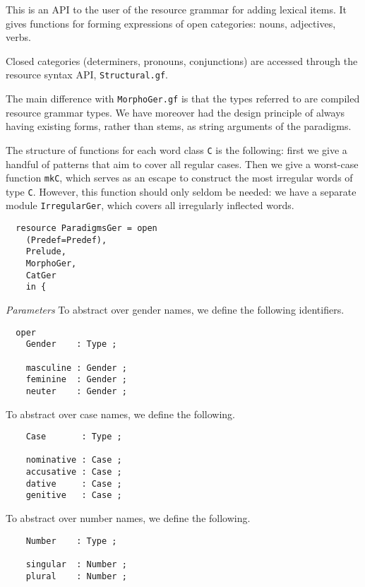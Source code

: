 \documentclass[11pt,a4paper]{article}
\newcommand{\subsubsubsection}[1]{\textit{#1}}
\begin{document}
This is an API to the user of the resource grammar 
for adding lexical items. It gives functions for forming
expressions of open categories: nouns, adjectives, verbs.

Closed categories (determiners, pronouns, conjunctions) are
accessed through the resource syntax API, \texttt{Structural.gf}. 

The main difference with \texttt{MorphoGer.gf} is that the types
referred to are compiled resource grammar types. We have moreover
had the design principle of always having existing forms, rather
than stems, as string arguments of the paradigms.

The structure of functions for each word class \texttt{C} is the following:
first we give a handful of patterns that aim to cover all
regular cases. Then we give a worst-case function \texttt{mkC}, which serves as an
escape to construct the most irregular words of type \texttt{C}.
However, this function should only seldom be needed: we have a
separate module \texttt{IrregularGer}, which covers all irregularly inflected
words.

\begin{verbatim}
  resource ParadigmsGer = open 
    (Predef=Predef), 
    Prelude, 
    MorphoGer,
    CatGer
    in {
\end{verbatim}

\subsubsubsection{Parameters}
To abstract over gender names, we define the following identifiers.

\begin{verbatim}
  oper
    Gender    : Type ; 
  
    masculine : Gender ;
    feminine  : Gender ;
    neuter    : Gender ;
\end{verbatim}

To abstract over case names, we define the following.

\begin{verbatim}
    Case       : Type ; 
  
    nominative : Case ;
    accusative : Case ;
    dative     : Case ;
    genitive   : Case ;
\end{verbatim}

To abstract over number names, we define the following.

\begin{verbatim}
    Number    : Type ; 
  
    singular  : Number ;
    plural    : Number ;
\end{verbatim}
\end{document}
